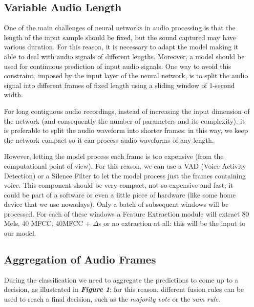 \documentclass[conference]{IEEEtran}
\begin{document}
\subsection{Variable Audio Length}
One of the main challenges of neural networks in audio processing is that the length of the input sample should be fixed, but the sound captured may have various duration. For this reason, it is necessary to adapt the model making it able to deal with audio signals of different lengths. Moreover, a model should be used for continuous prediction of input audio signals. One way to avoid this constraint, imposed by the input layer of the neural network, is to split the audio signal into different frames of fixed length using a sliding window of 1-second width.

For long contiguous audio recordings, instead of increasing the input dimension of the network (and consequently the number of parameters and its complexity), it is preferable to split the audio waveform into shorter frames: in this way, we keep the network compact so it can process audio waveforms of any length.

However, letting the model process each frame is too expensive (from the computational point of view). For this reason, we can use a VAD (Voice Activity Detection) or a Silence Filter to let the model process just the frames containing voice. This component should be very compact, not so expensive and fast; it could be part of a software or even a little piece of hardware (like some home device that we use nowadays).
Only a batch of subsequent windows will be processed. For each of these windows a Feature Extraction module will extract 80 Mels, 40 MFCC, 40MFCC + $\Delta$s or no extraction at all: this will be the input to our model.

\subsection{Aggregation of Audio Frames}
During the classification we need to aggregate the predictions to come up to a decision, as illustrated in \textbf{\textit{Figure 1}}; for this reason, different fusion rules can be used to reach a final decision, such as the \textit{majority vote} or the \textit{sum rule}.
\end{document}
